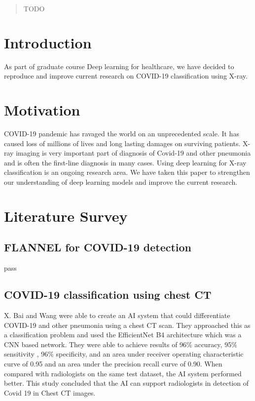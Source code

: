 \documentclass{sigkddExp}
\begin{document}
\date{30 July 1999}
\maketitle
\begin{abstract}
    TODO
\end{abstract}

\section{Introduction}
As part of graduate course Deep learning for healthcare, we
have decided to reproduce and improve current research on COVID-19 classification using
X-ray.


\section{Motivation}
COVID-19 pandemic has ravaged the world on an unprecedented scale. It has caused loss
of millions of lives and long lasting damages on surviving patients. X-ray imaging
is very important part of diagnosis of Covid-19 and other pneumonia and is often the
first-line diagnosis in many cases. Using deep learning for X-ray classification is
an ongoing research area. We have taken this paper to strengthen our understanding of
deep learning models and improve the current research.


\section{Literature Survey}

\subsection{FLANNEL for COVID-19 detection}\cite{10.1093/jamia/ocaa280}

pass



\subsection{COVID-19 classification using chest CT}\cite{pmid32339081}

X. Bai and Wang were able to create an AI system that could differentiate
COVID-19 and other pneumonia using a chest CT scan. They approached this
as a classification problem and used the EfficientNet B4 architecture which
was a CNN based network. They were able to achieve results of 96\% accuracy,
95\% sensitivity , 96\% specificity, and an area under receiver operating
characteristic curve of 0.95 and an area under the precision recall curve of
0.90. When compared with radiologists on the same test dataset, the AI system
performed better. This study concluded that the AI can support radiologists
in detection of Covid 19 in Chest CT images.
\end{document}
